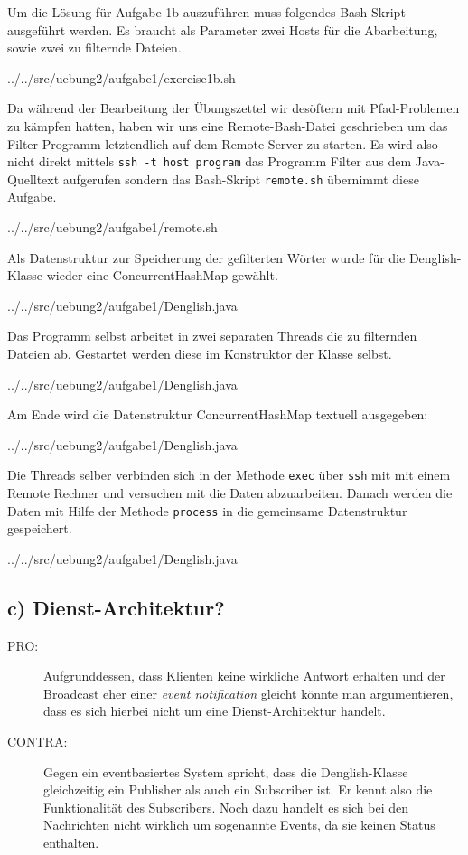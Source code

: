 	Um die Lösung für Aufgabe 1b auszuführen muss folgendes Bash-Skript ausgeführt werden.
	Es braucht als Parameter zwei Hosts für die Abarbeitung, sowie zwei zu filternde Dateien.
	
	{../../src/uebung2/aufgabe1/exercise1b.sh}

	Da während der Bearbeitung der Übungszettel wir desöftern mit Pfad-Problemen zu kämpfen hatten,
	haben wir uns eine Remote-Bash-Datei geschrieben um das Filter-Programm letztendlich auf dem Remote-Server zu starten.
	Es wird also nicht direkt mittels \texttt{ssh -t host program} das Programm Filter aus dem Java-Quelltext aufgerufen
	sondern das Bash-Skript \texttt{remote.sh} übernimmt diese Aufgabe. 
	
	{../../src/uebung2/aufgabe1/remote.sh}

	Als Datenstruktur zur Speicherung der gefilterten Wörter wurde für die Denglish-Klasse wieder eine ConcurrentHashMap gewählt.
	
	{../../src/uebung2/aufgabe1/Denglish.java}

	Das Programm selbst arbeitet in zwei separaten Threads die zu filternden Dateien ab.
	Gestartet werden diese im Konstruktor der Klasse selbst.
	
	{../../src/uebung2/aufgabe1/Denglish.java}

	Am Ende wird die Datenstruktur ConcurrentHashMap textuell ausgegeben:
	
	{../../src/uebung2/aufgabe1/Denglish.java}


	Die Threads selber verbinden sich in der Methode \texttt{exec}  über \texttt{ssh} mit mit einem Remote Rechner und versuchen mit die Daten abzuarbeiten.
	Danach werden die Daten mit Hilfe der Methode \texttt{process} in die gemeinsame Datenstruktur gespeichert.
	
	{../../src/uebung2/aufgabe1/Denglish.java}



	
\subsection*{c) Dienst-Architektur?}
\begin{description}
\item[PRO:]
	Aufgrunddessen, dass Klienten keine wirkliche Antwort erhalten und der Broadcast eher einer \textit{event notification} gleicht könnte man argumentieren, dass es sich hierbei nicht um eine Dienst-Architektur handelt.

\item[CONTRA:]
	Gegen ein eventbasiertes System spricht, dass die Denglish-Klasse gleichzeitig ein Publisher als auch ein Subscriber ist.
	Er kennt also die Funktionalität des Subscribers. Noch dazu handelt es sich bei den Nachrichten nicht wirklich um sogenannte Events, da sie keinen Status enthalten.
\end{description}
